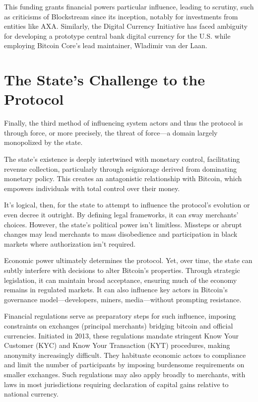 \documentclass[
  a5paper,
  smalldemyvopaper,10pt,twoside,onecolumn,openright,extrafontsizes,hidelinks]{memoir}
\begin{document}
This funding grants financial powers particular influence, leading to
scrutiny, such as criticisms of Blockstream since its inception, notably
for investments from entities like AXA. Similarly, the Digital Currency
Initiative has faced ambiguity for developing a prototype central bank
digital currency for the U.S. while employing Bitcoin Core's lead
maintainer, Wladimir van der Laan.

\section*{The State's Challenge to the
Protocol}\label{the-states-challenge-to-the-protocol}


Finally, the third method of influencing system actors and thus the
protocol is through force, or more precisely, the threat of force---a
domain largely monopolized by the state.

The state's existence is deeply intertwined with monetary control,
facilitating revenue collection, particularly through seigniorage
derived from dominating monetary policy. This creates an antagonistic
relationship with Bitcoin, which empowers individuals with total control
over their money.

It's logical, then, for the state to attempt to influence the protocol's
evolution or even decree it outright. By defining legal frameworks, it
can sway merchants' choices. However, the state's political power isn't
limitless. Missteps or abrupt changes may lead merchants to mass
disobedience and participation in black markets where authorization
isn't required.

Economic power ultimately determines the protocol. Yet, over time, the
state can subtly interfere with decisions to alter Bitcoin's properties.
Through strategic legislation, it can maintain broad acceptance,
ensuring much of the economy remains in regulated markets. It can also
influence key actors in Bitcoin's governance model---developers, miners,
media---without prompting resistance.

Financial regulations serve as preparatory steps for such influence,
imposing constraints on exchanges (principal merchants) bridging bitcoin
and official currencies. Initiated in 2013, these regulations mandate
stringent Know Your Customer (KYC) and Know Your Transaction (KYT)
procedures, making anonymity increasingly difficult. They habituate
economic actors to compliance and limit the number of participants by
imposing burdensome requirements on smaller exchanges. Such regulations
may also apply broadly to merchants, with laws in most jurisdictions
requiring declaration of capital gains relative to national currency.
\end{document}
